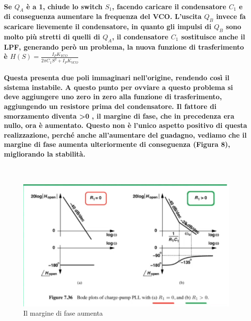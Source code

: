 \documentclass[a4paper]{article}
\begin{document}
\paragraph{Se $Q_A$ è a 1, chiude lo switch $S_1$, facendo caricare il condensatore $C_1$ e di conseguenza aumentare la frequenza del VCO.
L'uscita $Q_B$ invece fa scaricare lievemente il condensatore, in quanto gli impulsi di $Q_B$ sono molto più stretti di quelli di $Q_A$, il condensatore $C_1$ sostituisce anche il LPF, generando però un problema, la nuova funzione di trasferimento è $H(S)=\frac{I_PK_{VCO}}{2\pi C_1S^2+I_PK_{VCO}}$}

\paragraph{Questa presenta due poli immaginari nell'origine, rendendo così il sistema instabile. A questo punto per ovviare a questo problema si deve  aggiungere uno zero in zero alla funzione di trasferimento, aggiungendo un resistore prima del condensatore.
Il fattore di smorzamento diventa \textgreater 0 , il margine di fase, che in precedenza era nullo, ora è aumentato.  
Questo non è l'unico aspetto positivo di questa realizzazione, perché anche all'aumentare del guadagno, vediamo che il margine di fase aumenta ulteriormente di conseguenza (Figura 8), migliorando la stabilità.}
~\begin{figure}[H]%
\includegraphics[scale=0.8]{ZPFD.png} 
\caption{Il margine di fase aumenta}
\label{fig:foo}
\end{figure}
\end{document}
